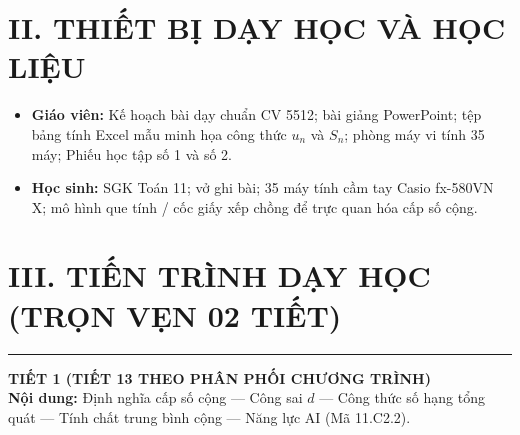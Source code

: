 \documentclass[12pt, a4paper]{article}
\begin{document}
\section*{II. THIẾT BỊ DẠY HỌC VÀ HỌC LIỆU}
\begin{itemize}[leftmargin=1.5em]
    \item \textbf{Giáo viên:} Kế hoạch bài dạy chuẩn CV 5512; bài giảng PowerPoint; tệp bảng tính Excel mẫu minh họa công thức $u_n$ và $S_n$; phòng máy vi tính 35 máy; Phiếu học tập số 1 và số 2.
    \item \textbf{Học sinh:} SGK Toán 11; vở ghi bài; 35 máy tính cầm tay Casio fx-580VN X; mô hình que tính / cốc giấy xếp chồng để trực quan hóa cấp số cộng.
\end{itemize}


\section*{III. TIẾN TRÌNH DẠY HỌC (TRỌN VẸN 02 TIẾT)}


\begin{center}
\end{center}


\vspace{1em}
\hrule
\vspace{0.8em}


{\large \textbf{TIẾT 1 (TIẾT 13 THEO PHÂN PHỐI CHƯƠNG TRÌNH)}}\\[0.3em]
\textbf{Nội dung:} Định nghĩa cấp số cộng --- Công sai $d$ --- Công thức số hạng tổng quát --- Tính chất trung bình cộng --- Năng lực AI (Mã 11.C2.2).
\end{document}
